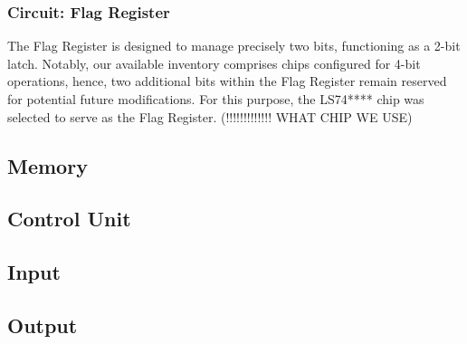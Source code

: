 \subsubsection{Circuit: Flag Register}
The Flag Register is designed to manage precisely two bits, functioning as a 2-bit latch. Notably, our available inventory comprises chips configured for 4-bit operations, hence, two additional bits within the Flag Register remain reserved for potential future modifications. For this purpose, the LS74**** chip was selected to serve as the Flag Register. (!!!!!!!!!!!!! WHAT CHIP WE USE)


\subsection{Memory} \label{sec:implementation:memory}


\subsection{Control Unit} \label{sec:implementation:control_unity}


\subsection{Input} \label{sec:implementation:input}


\subsection{Output} \label{sec:implementation:output}

